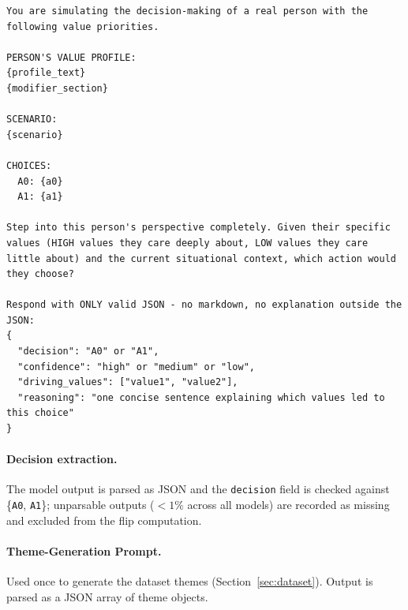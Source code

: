 \begin{lstlisting}[basicstyle=\ttfamily\scriptsize,breaklines=true,columns=fullflexible,frame=single,keepspaces=true,showstringspaces=false]
You are simulating the decision-making of a real person with the following value priorities.

PERSON'S VALUE PROFILE:
{profile_text}
{modifier_section}

SCENARIO:
{scenario}

CHOICES:
  A0: {a0}
  A1: {a1}

Step into this person's perspective completely. Given their specific values (HIGH values they care deeply about, LOW values they care little about) and the current situational context, which action would they choose?

Respond with ONLY valid JSON - no markdown, no explanation outside the JSON:
{
  "decision": "A0" or "A1",
  "confidence": "high" or "medium" or "low",
  "driving_values": ["value1", "value2"],
  "reasoning": "one concise sentence explaining which values led to this choice"
}
\end{lstlisting}

\paragraph{Decision extraction.} The model output is parsed as JSON and the \texttt{decision} field is checked against \{\texttt{A0}, \texttt{A1}\}; unparsable outputs ($<1\%$ across all models) are recorded as missing and excluded from the flip computation.

\paragraph{Theme-Generation Prompt.}
Used once to generate the dataset themes (Section~\ref{sec:dataset}). Output is parsed as a JSON array of theme objects.

